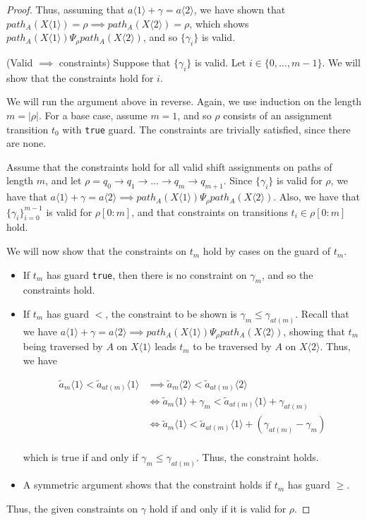 \documentclass{article}
\newcommand{\1}{\langle 1 \rangle}
\newcommand{\2}{\langle 2 \rangle}
\begin{document}
\begin{proof}
    Thus, assuming that $a \1 + \gamma = a \2$, we have shown that $path_A(X \1) = \rho \implies path_A(X \2) = \rho$, which shows $path_A(X \1) \Psi_\rho path_A(X \2)$, and so $\{\gamma_i\}$ is valid.

    (Valid $\implies$ constraints) Suppose that $\{\gamma_i\}$ is valid. Let $i \in \{0, \dots, m - 1\}$. We will show that the constraints hold for $i$. 

    We will run the argument above in reverse. Again, we use induction on the length $m = |\rho|$. For a base case, assume $m = 1$, and so $\rho$ consists of an assignment transition $t_0$ with \texttt{true} guard. The constraints are trivially satisfied, since there are none. 

    Assume that the constraints hold for all valid shift assignments on paths of length $m$, and let $\rho = q_0 \to q_1 \to \dots \to q_{m} \to q_{m + 1}$. Since $\{\gamma_i\}$ is valid for $\rho$, we have that $a \1 + \gamma = a \2 \implies path_A(X \1) \Psi_\rho path_A(X \2)$. Also, we have that $\{\gamma_i\}_{i = 0}^{m - 1}$ is valid for $\rho[0:m]$, and that constraints on transitions $t_i \in \rho[0:m]$ hold. 

    We will now show that the constraints on $t_{m}$ hold by cases on the guard of $t_{m}$.

    \begin{itemize}
        \item If $t_{m}$ has guard \texttt{true}, then there is no constraint on $\gamma_{m}$, and so the constraints hold.
        \item If $t_{m}$ has guard $<$, the constraint to be shown is $\gamma_m \leq \gamma_{at(m)}$. Recall that we have $a \1 + \gamma = a \2 \implies path_A(X \1) \Psi_\rho path_A(X \2)$, showing that $t_m$ being traversed by $A$ on $X \1$ leads $t_m$ to be traversed by $A$ on $X \2$. Thus, we have 
        
        \begin{align*}
            \tilde{a}_m \1 < \tilde{a}_{at(m)} \1 &\implies \tilde{a}_m \2 < \tilde{a}_{at(m)} \2\\
             &\iff \tilde{a}_m \1 + \gamma_m < \tilde{a}_{at(m)} \1 + \gamma_{at(m)}\\
             &\iff \tilde{a}_m \1 < \tilde{a}_{at(m)} \1 + (\gamma_{at(m)} - \gamma_m)\\
        \end{align*}

        which is true if and only if $\gamma_m \leq \gamma_{at(m)}$. Thus, the constraint holds.
        \item A symmetric argument shows that the constraint holds if $t_{m}$ has guard $\geq$.
    \end{itemize}

    Thus, the given constraints on $\gamma$ hold if and only if it is valid for $\rho$.
\end{proof}
\end{document}
